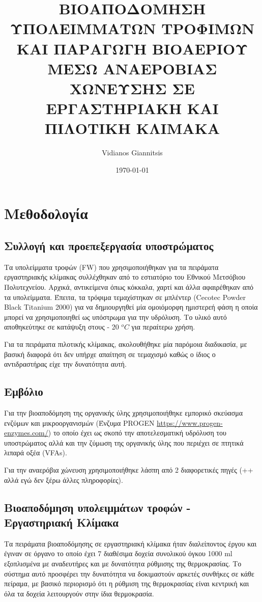\documentclass[11pt]{article}
\author{Vidianos Giannitsis}
\date{\today}
\title{ΒΙΟΑΠΟΔΟΜΗΣΗ ΥΠΟΛΕΙΜΜΑΤΩΝ ΤΡΟΦΙΜΩΝ ΚΑΙ ΠΑΡΑΓΩΓΗ ΒΙΟΑΕΡΙΟΥ ΜΕΣΩ ΑΝΑΕΡΟΒΙΑΣ ΧΩΝΕΥΣΗΣ ΣΕ ΕΡΓΑΣΤΗΡΙΑΚΗ ΚΑΙ ΠΙΛΟΤΙΚΗ ΚΛΙΜΑΚΑ}
\begin{document}
\maketitle
\tableofcontents


\section{Μεθοδολογία}
\label{sec:org01c1556}
\subsection{Συλλογή και προεπεξεργασία υποστρώματος}
\label{sec:org108372b}
Τα υπολείμματα τροφών (FW) που χρησιμοποιήθηκαν για τα πειράματα εργαστηριακής κλίμακας συλλέχθηκαν από το εστιατόριο του Εθνικού Μετσόβιου Πολυτεχνείου. Αρχικά, αντικείμενα όπως κόκκαλα, χαρτί και άλλα αφαιρέθηκαν από τα υπολείμματα. Έπειτα, τα τρόφιμα τεμαχίστηκαν σε μπλέντερ (Cecotec Powder Black Titanium 2000) για να δημιουργηθεί μία ομοιόμορφη ημιστερεή φάση η οποία μπορεί να χρησιμοποιηθεί ως υπόστρωμα για την υδρόλυση. Το υλικό αυτό αποθηκεύτηκε σε κατάψυξη στους - 20 \(^oC\) για περαίτερω χρήση.

Για τα πειράματα πιλοτικής κλίμακας, ακολουθήθηκε μία παρόμοια διαδικασία, με βασική διαφορά ότι δεν υπήρχε απαίτηση σε τεμαχισμό καθώς ο ίδιος ο αντιδραστήρας είχε την δυνατότητα αυτή.

\subsection{Εμβόλιο}
\label{sec:orgfbf78e3}
Για την βιοαποδόμηση της οργανικής ύλης χρησιμοποιήθηκε εμπορικό σκεύασμα ενζύμων και μικροοργανισμών (Ένζυμα PROGEN \url{https://www.progen-enzymes.com/}) το οποίο έχει ως σκοπό την αποτελεσματική υδρόλυση του υποστρώματος αλλά και την ζύμωση της οργανικής ύλης που περιέχει σε πτητικά λιπαρά οξέα (VFAs).

Για την αναερόβια χώνευση χρησιμοποιήθηκε λάσπη από 2 διαφορετικές πηγές (++ αλλά εγώ δεν ξέρω άλλες πληροφορίες).

\subsection{Βιοαποδόμηση υπολειμμάτων τροφών - Εργαστηριακή Κλίμακα}
\label{sec:orga1131ed}
Τα πειράματα βιοαποδόμησης σε εργαστηριακή κλίμακα ήταν διαλείποντος έργου και έγιναν σε όργανο το οποίο έχει 7 διαθέσιμα δοχεία συνολικού όγκου 1000 ml εξοπλισμένα με αναδευτήρες και με δυνατότητα ρύθμισης της θερμοκρασίας. Το σύστημα αυτό προσφέρει την δυνατότητα να δοκιμαστούν αρκετές συνθήκες σε κάθε πείραμα, με βασικό περιορισμό ότι η ρύθμιση της θερμοκρασίας είναι κεντρική και όλα τα δοχεία λειτουργούν στην ίδια θερμοκρασία.
\end{document}
